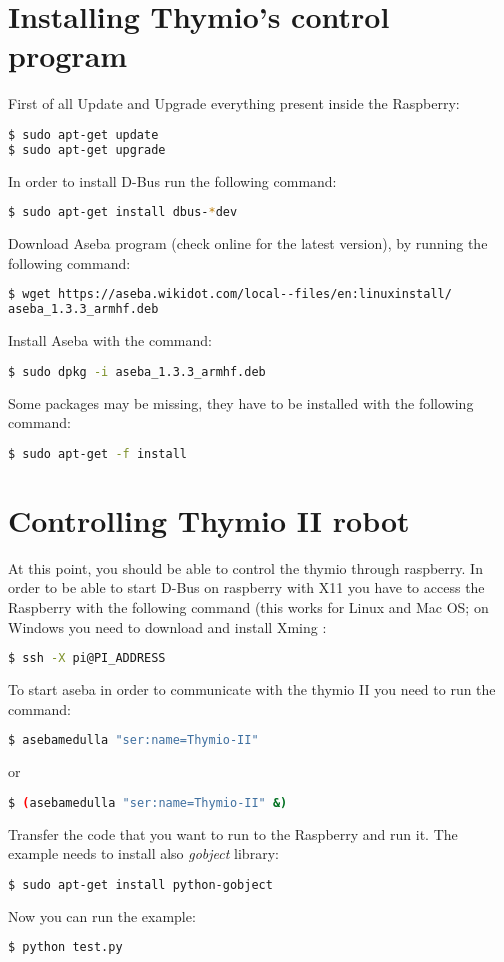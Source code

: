 \documentclass[12pt]{article}%
\begin{document}
\section{Installing Thymio's control program}
	First of all Update and Upgrade everything present inside the Raspberry:
	\begin{lstlisting}[language=Bash]
$ sudo apt-get update
$ sudo apt-get upgrade
	\end{lstlisting}
	In order to install D-Bus run the following command:
	\begin{lstlisting}[language=Bash]
$ sudo apt-get install dbus-*dev
	\end{lstlisting}
	Download Aseba program (check online for the latest version), by running the following command:
	\begin{lstlisting}[language=Bash]
$ wget https://aseba.wikidot.com/local--files/en:linuxinstall/
aseba_1.3.3_armhf.deb
	\end{lstlisting}
	Install Aseba with the command:
	\begin{lstlisting}[language=Bash]
$ sudo dpkg -i aseba_1.3.3_armhf.deb
	\end{lstlisting}
	Some packages may be missing, they have to be installed with the following command:
	\begin{lstlisting}[language=Bash]
$ sudo apt-get -f install
	\end{lstlisting}
	
\section{Controlling Thymio II robot}
	At this point, you should be able to control the thymio through raspberry.
	In order to be able to start D-Bus on raspberry with X11 you have to access the Raspberry with the following command (this works for Linux and Mac OS; on Windows you need to download and install Xming \cite{xming}:
	\begin{lstlisting}[language=Bash]
$ ssh -X pi@PI_ADDRESS
	\end{lstlisting}
	To start aseba in order to communicate with the thymio II you need to run the command:
	\begin{lstlisting}[language=Bash]
$ asebamedulla "ser:name=Thymio-II"
	\end{lstlisting}
	or
	\begin{lstlisting}[language=Bash]
$ (asebamedulla "ser:name=Thymio-II" &)
	\end{lstlisting}
	Transfer the code that you want to run to the Raspberry and run it.
	The example needs to install also \textit{gobject} library:
	\begin{lstlisting}[language=Bash]
$ sudo apt-get install python-gobject
	\end{lstlisting}
	Now you can run the example:
	\begin{lstlisting}[language=Bash]
$ python test.py
	\end{lstlisting}
\end{document}
